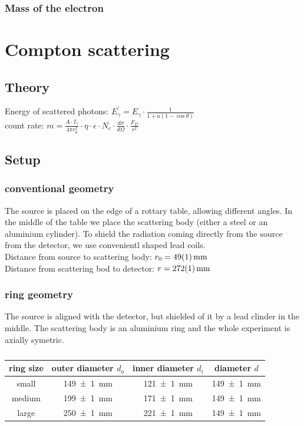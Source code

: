 \documentclass[a4paper,12pt]{article}
\begin{document}
\subsubsection{Mass of the electron}


\section{Compton scattering}

\subsection{Theory}
Energy of scattered photons: $E_\gamma^\prime = E_\gamma \cdot \frac{1}{1+a(1-\cos\theta)}$\\
count rate: $m = \frac{A \cdot I_\gamma}{4 \pi r_0^2} \cdot \eta \cdot \epsilon \cdot N_e \cdot \frac{d\sigma}{d\Omega} \cdot \frac{F_D}{r^2}$

\subsection{Setup}

\subsubsection{conventional geometry}
The source is placed on the edge of a rottary table, allowing different angles. In the middle of the table we place the scattering body (either a steel or an aluminium cylinder). To shield the radiation coming directly from the source from the detector, we use convenientl shaped lead coils.\\
Distance from source to scattering body: $r_0 = \SI{49+-1}{mm}$\\
Distance from scattering bod to detector: $r = \SI{272+-1}{mm}$\\

\subsubsection{ring geometry}
The source is aligned with the detector, but shielded of it by a lead clinder in the middle. The scattering body is an aluminium ring and the whole experiment is axially symetric.

\begin{table}[H]
	\renewcommand{\arraystretch}{1.5}
	\centering
	\begin{tabular}{|c|c|c|c|}
		\hline
		ring size & outer diameter $d_o$ & inner diameter $d_i$ & diameter $d$ \\
		\hline
		small & \SI{149+-1}{mm} & \SI{121+-1}{mm} & \SI{149+-1}{mm} \\
		\hline
		medium & \SI{199+-1}{mm} & \SI{171+-1}{mm} & \SI{149+-1}{mm} \\
		\hline
		large & \SI{250+-1}{mm} & \SI{221+-1}{mm} & \SI{149+-1}{mm} \\
		\hline
	\end{tabular}
	\caption{ }
	\label{tab:probes }
\end{table}
\end{document}
